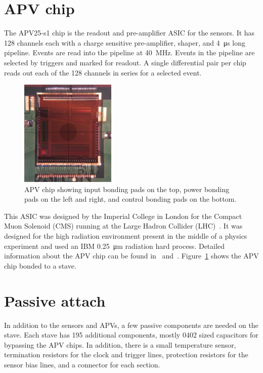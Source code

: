 \documentclass[1p,12pt]{elsarticle}
\begin{document}
\section{APV chip}
The APV25-s1 chip is the readout and pre-amplifier ASIC for the sensors. It has
128 channels each with a charge sensitive pre-amplifier, shaper, and \SI{4}{\micro\second} long
pipeline. Events are read into the pipeline at \SI{40}{\mega\hertz}. Events in the pipeline are selected by
triggers and marked for readout. A single differential pair per chip reads out each of
the 128 channels in series for a selected event.

\begin{figure}[ht]
\begin{center}
\includegraphics[height=2in, keepaspectratio=true, angle=0]{graphics/apv_chip.jpg}
\caption{APV chip showing input bonding pads on the top, power bonding pads on
the left and right, and control bonding pads on the bottom.
\label{fig:apv}}
\end{center}
\end{figure}
%
This ASIC was designed by the Imperial College in London for the Compact Muon
Solenoid (CMS) running at the Large Hadron Collider (LHC)~\cite{ref:apv_nim}. It was designed
for the high radiation environment present in the middle of a physics experiment
and used an IBM \SI{0.25}{\micro\meter} radiation hard process. Detailed information about the
APV chip can be found in~\cite{ref:apv} and~\cite{ref:apv_nim}.  Figure~\ref{fig:apv} shows the APV 
chip bonded to a stave.

\section{Passive attach}
In addition to the sensors and APVs, a few passive components are needed on the stave.
Each stave has 195 additional components, mostly 0402 sized capacitors for
bypassing the APV chips. In addition, there is a small temperature sensor,
termination resistors for the clock and trigger lines, protection resistors for
the sensor bias lines, and a connector for each section.
\end{document}
